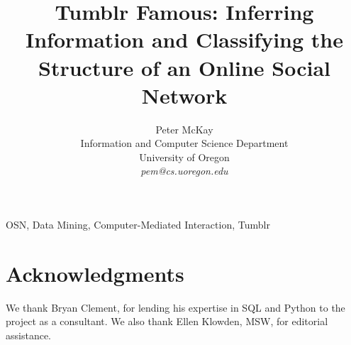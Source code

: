 \documentclass[10pt,twocolumn]{IEEEtran11}
\begin{document}
%


\title{\Large \bf Tumblr Famous: Inferring Information and Classifying the Structure of an Online Social Network
}
\author{
Peter McKay\\
Information and Computer Science Department\\
University of Oregon\\
{\em pem@cs.uoregon.edu}
}
\maketitle


\begin{keywords} 
OSN, Data Mining, Computer-Mediated Interaction, Tumblr
\end{keywords}









\section{Acknowledgments}
We thank Bryan Clement, for lending his expertise in SQL and Python to 
the project as a consultant. We also thank Ellen Klowden, MSW, for 
editorial assistance.


\end{document}
